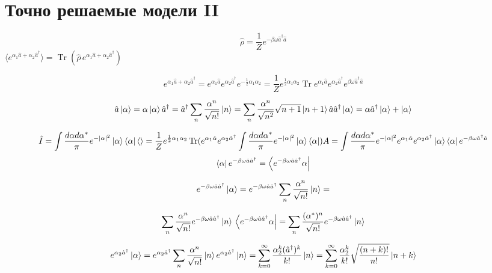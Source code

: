 \section[Cеминар 6]{Точно решаемые модели II}

\begin{problem}
	$$
	\hat{\rho}=\frac{1}{Z} e^{-\beta \omega \hat{a}^{\dagger} \hat{a}}
	$$
	$
		\langle e^{\alpha_1 \hat{a} + \alpha_2 \hat{a}^\dagger}\rangle = \operatorname{Tr}(\hat{\rho} \hspace{2pt }e^{\alpha_1 \hat{a} + \alpha_2 \hat{a}^\dagger})
	$

	$$
	e^{\alpha_1 \hat{a} + \alpha_2 \hat{a}^{\dagger}} = e^{\alpha_1 \hat{a}} e^{\alpha_2 \hat{a}^\dagger}e^{-\frac{1}{2}\alpha_1 \alpha_2} = \frac{1}{Z}e^{\frac{1}{2}\alpha_1 \alpha_2}\operatorname{Tr}e^{\alpha_1 \hat{a}} e^{\alpha_2 \hat{a}^{\dagger}} e^{\beta \omega \hat{a}^{\dagger}\hat{a}}
	$$
	
		$$
		\hat{a}\ket{\alpha} = \alpha \ket{\alpha}
		\hat{a}^{\dagger} = \hat{a}^{\dagger} \sum_{n} \frac{\alpha^n}{\sqrt{n!}}\ket{n} = 
		\sum_{n} \frac{\alpha^{n}}{\sqrt{n^{2}}} \sqrt{n+1}\ket{n+1} 
		\hat{a} \hat{a}^{\dagger}\ket{\alpha}=\alpha \hat{a}^{\dagger}\ket{\alpha}+\ket{\alpha}
		$$
		
		$$
		\hat{I} = \int \frac{d\alpha d \alpha^{*} }{\pi} e^{-|\alpha|^2} \ket{\alpha}\bra{\alpha}
		\langle\rangle = \frac{1}{Z} e^{\frac{1}{2} \alpha_1 \alpha_2}\\ \operatorname{Tr}(e^{\alpha_{1} \hat{\alpha}} e^{\alpha_{2} \hat{\alpha}^{\dagger}} \int \frac{d\alpha d \alpha^{*} }{\pi} e^{-|\alpha|^2} \ket{\alpha}\bra{\alpha})
		A = \int \frac{d\alpha d \alpha^{*} }{\pi} e^{-|\alpha|^2} e^{\alpha_{1} \hat{\alpha}} e^{\alpha_{2} \hat{\alpha}^{\dagger} }\ket{\alpha}\bra{\alpha} e^{-\beta \omega \hat{a}^{\dagger} \hat{a}} 
		$$
		$$
		\bra{\alpha} e^{-\beta \omega \hat{a} \hat{a}^\dagger} = \bra{e^{-\beta \omega \hat{a} \hat{a}^\dagger} \alpha} 
		$$
		
		$$
		e^{-\beta \omega \hat{a} \hat{a}^\dagger} \ket{\alpha} = e^{-\beta \omega \hat{a} \hat{a}^\dagger}  \sum_{n} \frac{\alpha^n}{\sqrt{n!}}\ket{n} = 
		$$
		
		$$
		\sum_{n} \frac{\alpha^n}{\sqrt{n!}}  e^{-\beta \omega \hat{a} \hat{a}^\dagger} \ket{n}\\
		\bra{e^{-\beta \omega \hat{a} \hat{a}^\dagger} \alpha} = \sum_{n} \frac{(\alpha^{*})^n}{\sqrt{n!}}  e^{-\beta \omega \hat{a} \hat{a}^\dagger} \ket{n}
		$$
		
		$$
		e^{\alpha_2 \hat{a}^{\dagger}} \ket{\alpha} = 	e^{\alpha_2 \hat{a}^{\dagger}}  \sum_{n} \frac{\alpha^n}{\sqrt{n!}}\ket{n}\\
			e^{\alpha_2 \hat{a}^{\dagger}} \ket{n} = \sum^{\infty}_{k = 0} \frac{\alpha^k_{2}(\hat{a}^{\dagger})^k}{k!} \ket{n} =  \sum^{\infty}_{k = 0} \frac{\alpha^k_{2}}{k!}\sqrt{\frac{(n+k)!}{n!}} \ket{n + k} 
		$$
		

\end{problem}
